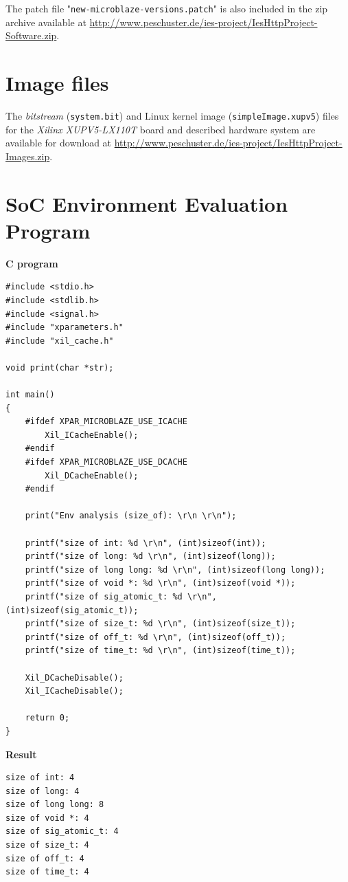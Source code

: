 The patch file "\texttt{new-microblaze-versions.patch}" is also included in the zip archive available at \url{http://www.peschuster.de/ies-project/IesHttpProject-Software.zip}.
\\

\section{Image files}

The \textit{bitstream} (\texttt{system.bit}) and Linux kernel image (\texttt{simpleImage.xupv5}) files for the \textit{Xilinx XUPV5-LX110T} board and described hardware system are available for download at \url{http://www.peschuster.de/ies-project/IesHttpProject-Images.zip}.


\section{SoC Environment Evaluation Program}
\label{sec:nginx-env-eval}

\textbf{C program}
\begin{verbatim}
#include <stdio.h>
#include <stdlib.h>
#include <signal.h>
#include "xparameters.h"
#include "xil_cache.h"

void print(char *str);

int main()
{
    #ifdef XPAR_MICROBLAZE_USE_ICACHE
        Xil_ICacheEnable();
    #endif
    #ifdef XPAR_MICROBLAZE_USE_DCACHE
        Xil_DCacheEnable();
    #endif

    print("Env analysis (size_of): \r\n \r\n");

    printf("size of int: %d \r\n", (int)sizeof(int));
    printf("size of long: %d \r\n", (int)sizeof(long));
    printf("size of long long: %d \r\n", (int)sizeof(long long));
    printf("size of void *: %d \r\n", (int)sizeof(void *));
    printf("size of sig_atomic_t: %d \r\n", (int)sizeof(sig_atomic_t));
    printf("size of size_t: %d \r\n", (int)sizeof(size_t));
    printf("size of off_t: %d \r\n", (int)sizeof(off_t));
    printf("size of time_t: %d \r\n", (int)sizeof(time_t));

    Xil_DCacheDisable();
    Xil_ICacheDisable();

    return 0;
}
\end{verbatim}

\textbf{Result}
\begin{verbatim}
size of int: 4
size of long: 4
size of long long: 8
size of void *: 4
size of sig_atomic_t: 4
size of size_t: 4
size of off_t: 4
size of time_t: 4
\end{verbatim}

